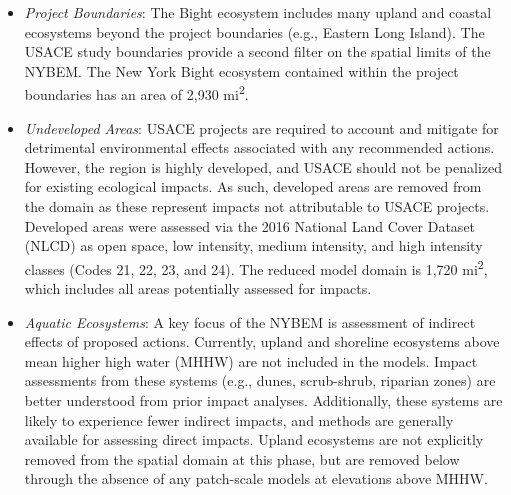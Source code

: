 \documentclass[
]{book}
\begin{document}
\citet{us_fish_and_wildlife_service_usfws_significant_1997}

\begin{itemize}
\item
  \emph{Project Boundaries}: The Bight ecosystem includes many upland and coastal ecosystems beyond the project boundaries (e.g., Eastern Long Island). The USACE study boundaries provide a second filter on the spatial limits of the NYBEM. The New York Bight ecosystem contained within the project boundaries has an area of 2,930 mi\textsuperscript{2}.
\item
  \emph{Undeveloped Areas}: USACE projects are required to account and mitigate for detrimental environmental effects associated with any recommended actions. However, the region is highly developed, and USACE should not be penalized for existing ecological impacts. As such, developed areas are removed from the domain as these represent impacts not attributable to USACE projects. Developed areas were assessed via the 2016 National Land Cover Dataset (NLCD) as open space, low intensity, medium intensity, and high intensity classes (Codes 21, 22, 23, and 24). The reduced model domain is 1,720 mi\textsuperscript{2}, which includes all areas potentially assessed for impacts.
\item
  \emph{Aquatic Ecosystems}: A key focus of the NYBEM is assessment of indirect effects of proposed actions. Currently, upland and shoreline ecosystems above mean higher high water (MHHW) are not included in the models. Impact assessments from these systems (e.g., dunes, scrub-shrub, riparian zones) are better understood from prior impact analyses. Additionally, these systems are likely to experience fewer indirect impacts, and methods are generally available for assessing direct impacts. Upland ecosystems are not explicitly removed from the spatial domain at this phase, but are removed below through the absence of any patch-scale models at elevations above MHHW.
\end{itemize}
\end{document}
